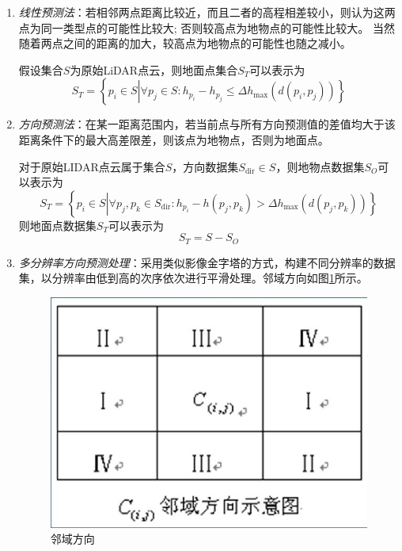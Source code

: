 \begin{enumerate}
	\item \textit{线性预测法}：若相邻两点距离比较近，而且二者的高程相差较小，则认为这两点为同一类型点的可能性比较大;
		否则较高点为地物点的可能性比较大。
		当然随着两点之间的距离的加大，较高点为地物点的可能性也随之减小。
			
		假设集合$ S $为原始LiDAR点云，则地面点集合$ S_T $可以表示为
		\begin{equation}
		S_T = \left\lbrace p_i \in S \left| ∀p_j \in S : h_{p_i} - h_{p_j} \leqslant Δh_{\max} \left( d(p_i,p_j) \right) \right. \right\rbrace
		\end{equation}
	\item \textit{方向预测法}：在某一距离范围内，若当前点与所有方向预测值的差值均大于该距离条件下的最大高差限差，则该点为地物点，否则为地面点。
	
		对于原始LIDAR点云属于集合$ S $，方向数据集$ S_{\text{dir}} \in S $，则地物点数据集$ S_O $可以表示为
		\begin{equation}
		S_T = \left\lbrace p_i \in S \left| ∀p_j,p_k \in S_{\text{dir}} : h_{p_i} - h(p_j,p_k) > Δh_{\max} \left( d(p_j,p_k) \right) \right. \right\rbrace
		\end{equation}
		则地面点数据集$ S_T $可以表示为
		\begin{equation}
		S_T = S - S_O
		\end{equation}
	\item \textit{多分辨率方向预测处理}：采用类似影像金字塔的方式，构建不同分辨率的数据集，以分辨率由低到高的次序依次进行平滑处理。邻域方向如图\ref{fig:邻域方向}所示。
		\begin{figure}[htbp]
			\centering
			\includegraphics[scale=0.5]{figure/Chapter6/邻域方向}
			\caption{邻域方向}
			\label{fig:邻域方向}
		\end{figure}
\end{enumerate}

